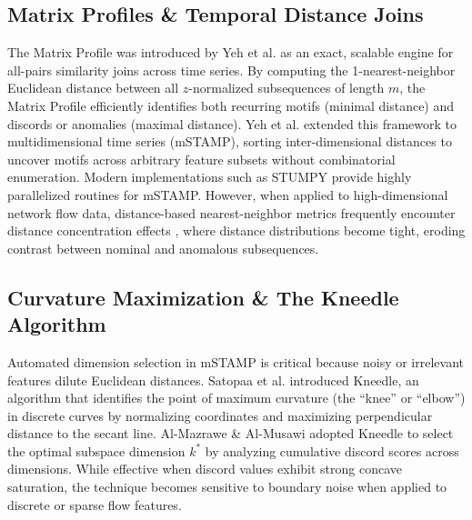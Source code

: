 \documentclass[10pt,twocolumn]{article}
\begin{document}
\subsection{Matrix Profiles \& Temporal Distance Joins}
The Matrix Profile was introduced by Yeh et al. \cite{yeh2016matrix} as an exact, scalable engine for all-pairs similarity joins across time series. By computing the 1-nearest-neighbor Euclidean distance between all $z$-normalized subsequences of length $m$, the Matrix Profile efficiently identifies both recurring motifs (minimal distance) and discords or anomalies (maximal distance). Yeh et al. \cite{yeh2017multidimensional} extended this framework to multidimensional time series (mSTAMP), sorting inter-dimensional distances to uncover motifs across arbitrary feature subsets without combinatorial enumeration. Modern implementations such as STUMPY \cite{law2019stumpy} provide highly parallelized routines for mSTAMP\@. However, when applied to high-dimensional network flow data, distance-based nearest-neighbor metrics frequently encounter distance concentration effects \cite{beyer1999nearest}, where distance distributions become tight, eroding contrast between nominal and anomalous subsequences.

\subsection{Curvature Maximization \& The Kneedle Algorithm}
Automated dimension selection in mSTAMP is critical because noisy or irrelevant features dilute Euclidean distances. Satopaa et al. \cite{satopaa2011finding} introduced Kneedle, an algorithm that identifies the point of maximum curvature (the ``knee'' or ``elbow'') in discrete curves by normalizing coordinates and maximizing perpendicular distance to the secant line. Al-Mazrawe \& Al-Musawi \cite{almazrawe2025enhancing} adopted Kneedle to select the optimal subspace dimension $k^*$ by analyzing cumulative discord scores across dimensions. While effective when discord values exhibit strong concave saturation, the technique becomes sensitive to boundary noise when applied to discrete or sparse flow features.
\end{document}
